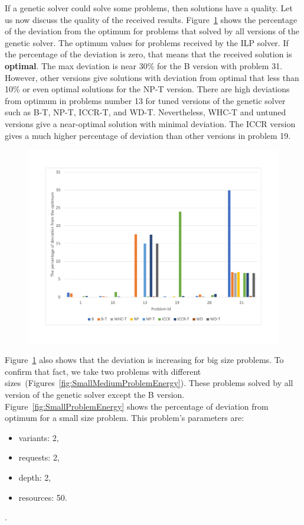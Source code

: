 If a genetic solver could solve some problems, then solutions have a quality.
Let us now discuss the quality of the received results. Figure~\ref{fig:EnergyPercentage} shows the percentage of the deviation from the optimum for problems that solved by all versions of the genetic solver. The optimum values for problems received by the ILP solver. If the percentage of the deviation is zero, that means that the received solution is \textbf{optimal}. The max deviation is near 30\% for the B version with problem 31. However, other versions give solutions with deviation from optimal that less than 10\% or even optimal solutions for the NP-T version. There are high deviations from optimum in problems number 13 for tuned versions of the genetic solver such as B-T, NP-T, ICCR-T, and WD-T. Nevertheless, WHC-T and untuned versions give a near-optimal solution with minimal deviation. The ICCR version gives a much higher percentage of deviation than other versions in problem 19.

\begin{figure}
	\centering
	\includegraphics[width=\textwidth]{images/EnergyPercentage.pdf}
	\caption[]{}
	\label{fig:EnergyPercentage}
\end{figure}

Figure~\ref{fig:EnergyPercentage} also shows that the deviation is increasing for big size problems. To confirm that fact, we take two problems with different sizes~(Figures~\ref{fig:SmallMediumProblemEnergy}). These problems solved by all version of the genetic solver except the B version. Figure~\ref{fig:SmallProblemEnergy} shows the percentage of deviation from optimum for a small size problem. This problem's parameters are:
\begin{itemize}
	\item variants: 2,
	\item requests: 2,
	\item depth: 2,
	\item resources: 50.
\end{itemize}.

